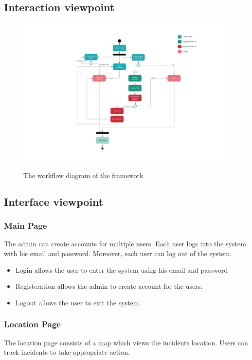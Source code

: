 \documentclass[12pt]{article}
\begin{document}
\subsection{Interaction viewpoint}
\begin{figure}[h]
  \centering
  \includegraphics[width=19cm]{Activity diagram.jpeg}
  \label{fig:2}
   \caption{The workflow diagram of the framework}
\end{figure}


\newpage

\subsection{Interface viewpoint}
\subsubsection{Main Page}
The admin can create accounts for multiple users. Each user logs into the system with his email and password. Moreover, each user can log out of the system.
\begin{itemize}
    \item Login allows the user to enter the system using his email and password
    \item Registeration allows the admin to create account for the users.
    \item Logout allows the user to exit the system.
\end{itemize}

\subsubsection{Location Page}
The location page consists of a map which views the incidents location. Users can track incidents to take appropriate action.
\end{document}
